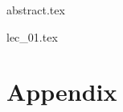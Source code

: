\documentclass[a4paper, english, fancyfoot, git]{mkessler-script}
\author{Maximilian Keßler}
\begin{document}
    \maketitle

    {abstract.tex}

    \cleardoublepage
    \tableofcontents

    \cleardoublepage
    \summaryoflectures

    \cleardoublepage
    {lec_01.tex}

    \cleardoublepage
    \appendix
    \part{Appendix}

    

    \cleardoublepage
    \printvocabindex


    \cleardoublepage
    \printliterature
\end{document}
